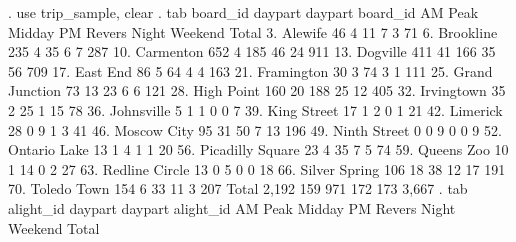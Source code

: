 . use trip_sample, clear
{\smallskip}
. tab board_id daypart
{\smallskip}
                     {\VBAR}                        daypart
            board_id {\VBAR}   AM Peak     Midday  PM Revers      Night    Weekend {\VBAR}     Total
          3. Alewife {\VBAR}        46          4         11          7          3 {\VBAR}        71 
        6. Brookline {\VBAR}       235          4         35          6          7 {\VBAR}       287 
       10. Carmenton {\VBAR}       652          4        185         46         24 {\VBAR}       911 
        13. Dogville {\VBAR}       411         41        166         35         56 {\VBAR}       709 
        17. East End {\VBAR}        86          5         64          4          4 {\VBAR}       163 
      21. Framington {\VBAR}        30          3         74          3          1 {\VBAR}       111 
  25. Grand Junction {\VBAR}        73         13         23          6          6 {\VBAR}       121 
      28. High Point {\VBAR}       160         20        188         25         12 {\VBAR}       405 
      32. Irvingtown {\VBAR}        35          2         25          1         15 {\VBAR}        78 
      36. Johnsville {\VBAR}         5          1          1          0          0 {\VBAR}         7 
     39. King Street {\VBAR}        17          1          2          0          1 {\VBAR}        21 
        42. Limerick {\VBAR}        28          0          9          1          3 {\VBAR}        41 
     46. Moscow City {\VBAR}        95         31         50          7         13 {\VBAR}       196 
    49. Ninth Street {\VBAR}         0          0          9          0          0 {\VBAR}         9 
    52. Ontario Lake {\VBAR}        13          1          4          1          1 {\VBAR}        20 
56. Picadilly Square {\VBAR}        23          4         35          7          5 {\VBAR}        74 
      59. Queens Zoo {\VBAR}        10          1         14          0          2 {\VBAR}        27 
  63. Redline Circle {\VBAR}        13          0          5          0          0 {\VBAR}        18 
   66. Silver Spring {\VBAR}       106         18         38         12         17 {\VBAR}       191 
     70. Toledo Town {\VBAR}       154          6         33         11          3 {\VBAR}       207 
               Total {\VBAR}     2,192        159        971        172        173 {\VBAR}     3,667 
{\smallskip}
{\smallskip}
. tab alight_id daypart
{\smallskip}
                     {\VBAR}                        daypart
           alight_id {\VBAR}   AM Peak     Midday  PM Revers      Night    Weekend {\VBAR}     Total
